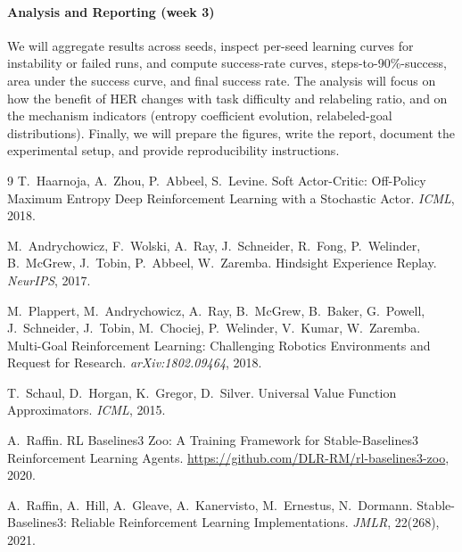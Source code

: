 \documentclass{article}
\begin{document}
\paragraph{Analysis and Reporting (week 3)}
We will aggregate results across seeds, inspect per-seed learning curves for
instability or failed runs, and compute success-rate curves,
steps-to-90\%-success, area under the success curve, and final success rate.
The analysis will focus on how the benefit of HER changes with task
difficulty and relabeling ratio, and on the mechanism indicators (entropy
coefficient evolution, relabeled-goal distributions). Finally, we will
prepare the figures, write the report, document the experimental setup, and
provide reproducibility instructions.

\begin{thebibliography}{9}
T.~Haarnoja, A.~Zhou, P.~Abbeel, S.~Levine.
\newblock Soft Actor-Critic: Off-Policy Maximum Entropy Deep Reinforcement
Learning with a Stochastic Actor.
\newblock \emph{ICML}, 2018.

M.~Andrychowicz, F.~Wolski, A.~Ray, J.~Schneider, R.~Fong, P.~Welinder,
B.~McGrew, J.~Tobin, P.~Abbeel, W.~Zaremba.
\newblock Hindsight Experience Replay.
\newblock \emph{NeurIPS}, 2017.

M.~Plappert, M.~Andrychowicz, A.~Ray, B.~McGrew, B.~Baker, G.~Powell,
J.~Schneider, J.~Tobin, M.~Chociej, P.~Welinder, V.~Kumar, W.~Zaremba.
\newblock Multi-Goal Reinforcement Learning: Challenging Robotics Environments
and Request for Research.
\newblock \emph{arXiv:1802.09464}, 2018.

T.~Schaul, D.~Horgan, K.~Gregor, D.~Silver.
\newblock Universal Value Function Approximators.
\newblock \emph{ICML}, 2015.

A.~Raffin.
\newblock RL Baselines3 Zoo: A Training Framework for Stable-Baselines3
Reinforcement Learning Agents.
\newblock \url{https://github.com/DLR-RM/rl-baselines3-zoo}, 2020.

A.~Raffin, A.~Hill, A.~Gleave, A.~Kanervisto, M.~Ernestus, N.~Dormann.
\newblock Stable-Baselines3: Reliable Reinforcement Learning Implementations.
\newblock \emph{JMLR}, 22(268), 2021.
\end{thebibliography}
\end{document}
